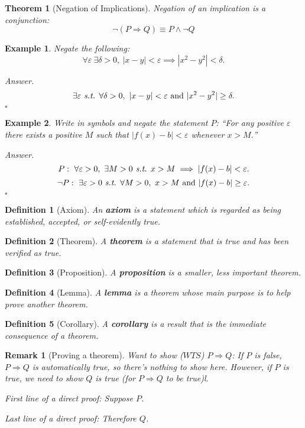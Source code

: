 \documentclass[12pt,a4paper]{article}
\newtheorem{thm}{Theorem}[subsection]
\newtheorem{df}{Definition}[subsection]
\newtheorem{eg}{Example}[subsection]
\newenvironment*{ans}{\par{\textit{Answer. }}}{\hfill{$\square$}\par}
\newtheorem*{rmk}{\indent Remark}
\def\st{\emph{ s.t. }}
\def\WTS{\mathit{WTS}}
\begin{document}
\begin{thm}[Negation of Implications]
	Negation of an implication is a conjunction:\[\neg(P\Rightarrow Q)\equiv P\wedge\neg Q\]	
\end{thm}
\begin{eg}
	Negate the following: \[\forall\varepsilon\ \exists\delta>0,\ |x-y|<\varepsilon\implies|x^2-y^2|<\delta.\]
	\begin{ans}
		\[\exists\varepsilon\st\forall\delta>0,\ |x-y|<\varepsilon\text{ and }|x^2-y^2|\geq\delta.\]
	\end{ans}
\end{eg}
\begin{eg}
	Write in symbols and negate the statement $P$: ``For any positive $\varepsilon$ there exists a positive $M$ such that $|f(x)-b|<\varepsilon$ whenever $x>M.$''	
	\begin{ans}
		\[P:\ \forall\varepsilon>0,\ \exists M>0\st x>M\implies|f(x)-b|<\varepsilon.\]\[\neg P:\ \exists\varepsilon>0\st\forall M>0,\ x>M\text{ and }|f(x)-b|\geq\varepsilon.\]	
	\end{ans}
\end{eg}
\begin{df}[Axiom]
	An \textbf{axiom} is a statement which is regarded as being established, accepted, or self-evidently true.
\end{df}
\begin{df}[Theorem]
	A \textbf{theorem} is a statement that is true and has been verified as true.	
\end{df}
\begin{df}[Proposition]
	A \textbf{proposition} is a smaller, less important theorem.	
\end{df}
\begin{df}[Lemma]
	A \textbf{lemma} is a theorem whose main purpose is to help prove another theorem.	
\end{df}
\begin{df}[Corollary]
	A \textbf{corollary} is a result that is the immediate consequence of a theorem. 	
\end{df}
\begin{rmk}[Proving a theorem]
	Want to show ($\WTS$) $P\Rightarrow Q$: If	$P$ is false, $P\Rightarrow Q$ is automatically true, so there's nothing to show here. However, if $P$ is true, we need to show $Q$ is true (for $P\Rightarrow Q$ to be true)l.
	
	First line of a direct proof: Suppose $P$.
	
	Last line of a direct proof: Therefore $Q$.
\end{rmk}
\end{document}
